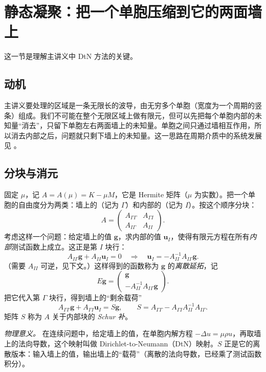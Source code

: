 \documentclass[11pt,a4paper,fontset=fandol]{ctexart}
\begin{document}
\section{静态凝聚：把一个单胞压缩到它的两面墙上}
\label{sec:schur}

这一节是理解主讲义中 DtN 方法的关键。

\subsection{动机}

主讲义要处理的区域是一条无限长的波导，由无穷多个单胞（宽度为一个周期的竖条）组成。我们不可能在整个无限区域上做有限元，但可以先把每个单胞内部的未知量“消去”，只留下单胞左右两面墙上的未知量。单胞之间只通过墙相互作用，所以消去内部之后，问题就只剩下墙上的未知量。这一思路在周期介质中的系统发展见 \cite{JolyLiFliss2006,Fliss2013}。

\subsection{分块与消元}

固定 $\mu$，记 $A=A(\mu)=K-\mu M$，它是 Hermite 矩阵（$\mu$ 为实数）。把一个单胞的自由度分为两类：墙上的（记为 $\Gamma$）和内部的（记为 $I$）。按这个顺序分块：
\[
A=\begin{pmatrix}A_{\Gamma\Gamma}&A_{\Gamma I}\\ A_{I\Gamma}&A_{II}\end{pmatrix}.
\]
考虑这样一个问题：给定墙上的值 $\bm g$，求内部的值 $\bm u_I$，使得有限元方程在所有\emph{内部}测试函数上成立。这正是第 $I$ 块行：
\[
A_{I\Gamma}\bm g+A_{II}\bm u_I=0\quad\Longrightarrow\quad\bm u_I=-A_{II}^{-1}A_{I\Gamma}\bm g .
\]
（需要 $A_{II}$ 可逆，见下文。）这样得到的函数称为 $\bm g$ 的\emph{离散延拓}，记
\begin{equation}
\label{eq:ext}
E\bm g=\begin{pmatrix}\bm g\\ -A_{II}^{-1}A_{I\Gamma}\bm g\end{pmatrix}.
\end{equation}
把它代入第 $\Gamma$ 块行，得到墙上的“剩余载荷”
\[
A_{\Gamma\Gamma}\bm g+A_{\Gamma I}\bm u_I=S\bm g,\qquad
S=A_{\Gamma\Gamma}-A_{\Gamma I}A_{II}^{-1}A_{I\Gamma}.
\]
矩阵 $S$ 称为 $A$ 关于内部块的 \emph{Schur 补}。

\emph{物理意义。} 在连续问题中，给定墙上的值，在单胞内解方程 $-\Delta u=\mu\rho u$，再取墙上的法向导数，这个映射叫做 Dirichlet-to-Neumann（DtN）映射。$S$ 正是它的离散版本：输入墙上的值，输出墙上的“载荷”（离散的法向导数，已经乘了测试函数积分）。
\end{document}
